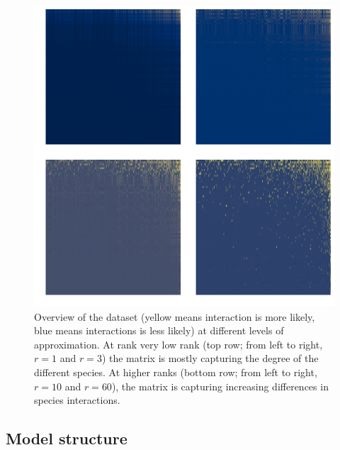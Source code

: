 \documentclass[10pt,oneside]{article}
\makeatletter
\def\maxwidth{\ifdim\Gin@nat@width>\linewidth\linewidth
\else\Gin@nat@width\fi}
\let\Oldincludegraphics\includegraphics
\renewcommand{\includegraphics}[1]{\Oldincludegraphics[width=\maxwidth]{#1}}
\makeatother
\begin{document}
\begin{figure}
\hypertarget{fig:lowrank}{%
\centering
\includegraphics{figures/lowrank_illustration.png}
\caption{Overview of the dataset (yellow means interaction is more
likely, blue means interactions is less likely) at different levels of
approximation. At rank very low rank (top row; from left to right,
\(r=1\) and \(r=3\)) the matrix is mostly capturing the degree of the
different species. At higher ranks (bottom row; from left to right,
\(r=10\) and \(r=60\)), the matrix is capturing increasing differences
in species interactions.}\label{fig:lowrank}
}
\end{figure}

\hypertarget{model-structure}{%
\subsection{Model structure}\label{model-structure}}
\end{document}
